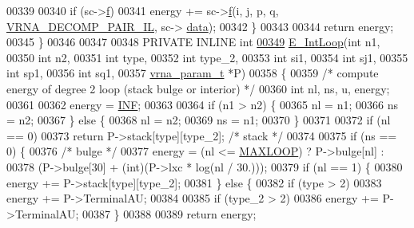 \begin{DoxyCode}
00339 
00340     \textcolor{keywordflow}{if} (sc->\hyperlink{group__soft__constraints_a32dc86090237888c75491bbd4861a04b}{f})
00341       energy += sc->\hyperlink{group__soft__constraints_a32dc86090237888c75491bbd4861a04b}{f}(i, j, p, q, \hyperlink{group__constraints_gaeab04f34d7730cff2d651d782f95d857}{VRNA\_DECOMP\_PAIR\_IL}, sc->
      \hyperlink{group__soft__constraints_a7574680143df97b9029146c2150bf06d}{data});
00342   \}
00343 
00344   \textcolor{keywordflow}{return} energy;
00345 \}
00346 
00347 
00348 PRIVATE INLINE \textcolor{keywordtype}{int}
\hyperlink{group__loops_gaafbc187b7f78e8e82afb77dd6f3b8fc5}{00349} \hyperlink{group__loops_gaafbc187b7f78e8e82afb77dd6f3b8fc5}{E\_IntLoop}(\textcolor{keywordtype}{int}           n1,
00350           \textcolor{keywordtype}{int}           n2,
00351           \textcolor{keywordtype}{int}           type,
00352           \textcolor{keywordtype}{int}           type\_2,
00353           \textcolor{keywordtype}{int}           si1,
00354           \textcolor{keywordtype}{int}           sj1,
00355           \textcolor{keywordtype}{int}           sp1,
00356           \textcolor{keywordtype}{int}           sq1,
00357           \hyperlink{group__energy__parameters_structvrna__param__s}{vrna\_param\_t}  *P)
00358 \{
00359   \textcolor{comment}{/* compute energy of degree 2 loop (stack bulge or interior) */}
00360   \textcolor{keywordtype}{int} nl, ns, u, energy;
00361 
00362   energy = \hyperlink{energy__const_8h_a12c2040f25d8e3a7b9e1c2024c618cb6}{INF};
00363 
00364   \textcolor{keywordflow}{if} (n1 > n2) \{
00365     nl  = n1;
00366     ns  = n2;
00367   \} \textcolor{keywordflow}{else} \{
00368     nl  = n2;
00369     ns  = n1;
00370   \}
00371 
00372   \textcolor{keywordflow}{if} (nl == 0)
00373     \textcolor{keywordflow}{return} P->stack[type][type\_2];  \textcolor{comment}{/* stack */}
00374 
00375   \textcolor{keywordflow}{if} (ns == 0) \{
00376     \textcolor{comment}{/* bulge */}
00377     energy = (nl <= \hyperlink{energy__const_8h_ad1bd6eabac419670ddd3c9ed82145988}{MAXLOOP}) ? P->bulge[nl] :
00378              (P->bulge[30] + (\textcolor{keywordtype}{int})(P->lxc * log(nl / 30.)));
00379     \textcolor{keywordflow}{if} (nl == 1) \{
00380       energy += P->stack[type][type\_2];
00381     \} \textcolor{keywordflow}{else} \{
00382       \textcolor{keywordflow}{if} (type > 2)
00383         energy += P->TerminalAU;
00384 
00385       \textcolor{keywordflow}{if} (type\_2 > 2)
00386         energy += P->TerminalAU;
00387     \}
00388 
00389     \textcolor{keywordflow}{return} energy;

\end{DoxyCode}
